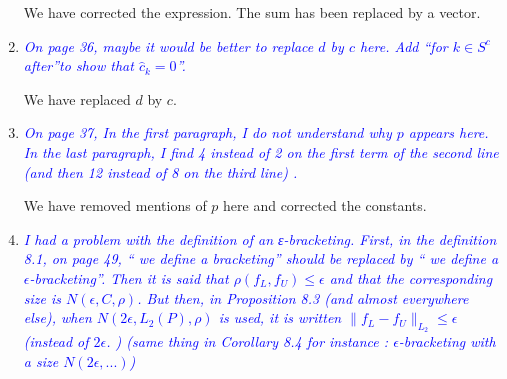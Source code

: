 \documentclass[pdftex,12pt]{article}
\let\hat\widehat
\def\rc#1{{\it\textcolor{blue}{#1}}\smallskip}
\begin{document}
\begin{enumerate}
We have corrected the expression. The sum has been replaced by a vector.

\item \rc{On page 36, maybe it would be better to replace $d$ by $c$ here. Add
``for $k\in S^c$ after''to show that $\hat c_k =0$''.}

We have replaced $d$ by $c$. 

\item \rc{On page 37, In the first paragraph, I do not understand why $p$ appears
here. In the last paragraph, I find 4 instead of 2 on the first term of
the second line (and then 12 instead of 8 on the third line) .}

We have removed mentions of $p$ here and corrected the constants.


\item \rc{I had a problem with the definition of an ε-bracketing. First, in the
definition 8.1, on page 49, `` we define a bracketing'' should be
replaced by `` we define a $\epsilon$-bracketing''. Then it is said that $\rho(f_L ,
f_U ) \leq \epsilon$ and that the corresponding size is $N(\epsilon,C,\rho)$. But then, in
Proposition 8.3 (and almost everywhere else), when $N(2\epsilon,L_2(P),\rho)$ is
used, it is written $\|f_L − f_U \|_{L_2} \leq \epsilon$ (instead of $2\epsilon$. ) (same thing in
Corollary 8.4 for instance : $\epsilon$-bracketing with a size $N(2\epsilon,...)$)}




\end{enumerate}
\end{document}
